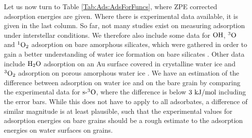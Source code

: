 \documentclass[8.5pt,twoside,twocolumn]{article}
\newcommand\zpe{\enmat{\te{ZPE}}}
\newcommand\sur{\enmat{\te{s-}}}
\renewcommand\K{{\enmat{~\te{K}}}}
\newcommand\tripo{\enmat{{^3\te{O}}}}
\newcommand\singot{\enmat{{^1\ot}}}
\newcommand\tripot{\enmat{{^3\ot}}}
\newcommand\kmo{\enmat{\te {kJ/mol}}}
\theoremstyle{standard}
\begin{document}
Let us now turn to Table \ref{Tab:Ads:AdsForFuncs}, where ZPE corrected adsorption
energies are given. Where there is experimental data available, it is given
in the last column. So far, not many studies exist on measuring 
adsorption under interstellar conditions. We therefore also include some data
for $\text O \text H$, $\tripo$ and $\singot$ adsorption on bare amorphous silicates, which were gathered in order to
gain a better understanding of water ice formation on bare silicates \cite{HeVidali2014,HeJingVidali2014}.
Other data include $\text H _2 \text O$ adsorption on an Au surface covered in crystalline water
ice\cite{Fraser2001} and $\tripot$ adsorption on porous amorphous water ice \cite{He2015}.
We have an estimation of the difference between adsorption on water ice and
on the bare grain by comparing the experimental data for $\sur\tripo$, where the difference
is below $3~\kmo$ including the error bars. While this does not have to apply to all
adsorbates, a difference of similar magnitude is at least plausible, such that
the experimental values for adsorption energies on bare grains should be a rough estimate
to the adsorption energies on water surfaces on grains.


\end{document}
